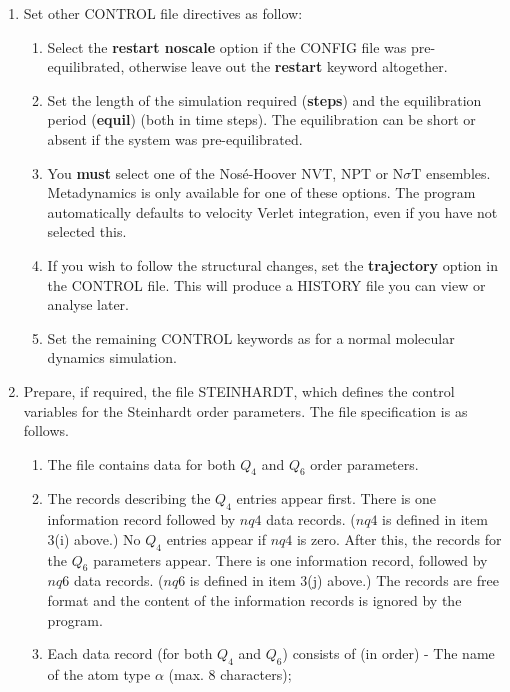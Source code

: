 \begin{enumerate}
\begin{enumerate}
\end{enumerate}
\item Set other CONTROL file directives as follow:
\begin{enumerate}
\item Select the {\bf restart noscale} option if the CONFIG file was
      pre-equilibrated, otherwise leave out the {\bf restart} keyword 
      altogether.
\item Set the length of the simulation required ({\bf steps}) and the 
      equilibration period ({\bf equil}) (both in time steps). The
      equilibration can be short or absent if the system was pre-equilibrated.
\item You {\bf must} select one of the Nos\'{e}-Hoover NVT, NPT or
      N$\sigma$T ensembles.  Metadynamics is only available for one of these
      options. The program automatically defaults to velocity Verlet 
      integration, even if you have not selected this.
\item If you wish to follow the structural changes, set the {\bf
      trajectory} option in the CONTROL file. This will produce a HISTORY file
      you can view or analyse later.
\item Set the remaining CONTROL keywords as for a normal molecular dynamics
  simulation. 
\end{enumerate}
\item Prepare, if required, the file STEINHARDT, which defines the 
  control variables for the Steinhardt order parameters. The file 
  specification is as follows.  
\begin{enumerate}
\item The file contains data for both  $Q_{4}$ and $Q_{6}$ order 
  parameters. 
\item The records describing the $Q_{4}$ entries appear first. There is 
  one information record followed by $nq4$ data records. ($nq4$ is defined in
  item 3(i) above.) No $Q_{4}$ entries appear if $nq4$ is zero. After this, 
  the records for the  $Q_{6}$ parameters appear.  There is one information 
  record, followed by $nq6$ data records. ($nq6$ is defined in item
  3(j) above.) The records are free format and the content of
  the information records is ignored by the program.
\item Each data record (for both $Q_{4}$ and $Q_{6}$) consists of 
  (in order)\newline
  - The name of the atom type $\alpha$ (max. 8 characters); \newline

\end{enumerate}
\end{enumerate}
